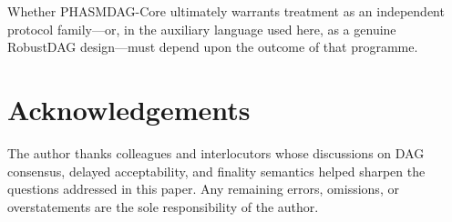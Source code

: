 \documentclass[11pt]{article}
\theoremstyle{definition}
\theoremstyle{plain}
\theoremstyle{remark}
\begin{document}
Whether PHASMDAG-Core ultimately warrants treatment as an independent protocol
family---or, in the auxiliary language used here, as a genuine RobustDAG
design---must depend upon the outcome of that programme.

\section*{Acknowledgements}

The author thanks colleagues and interlocutors whose discussions on DAG
consensus, delayed acceptability, and finality semantics helped sharpen the
questions addressed in this paper.
Any remaining errors, omissions, or overstatements are the sole
responsibility of the author.


\end{document}
